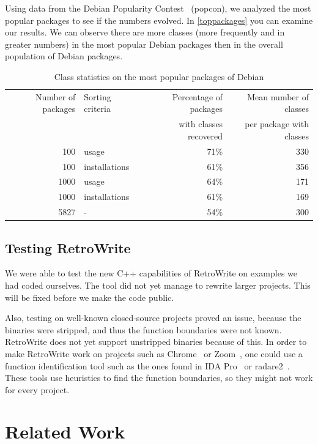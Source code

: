 \documentclass[a4paper,11pt,oneside]{report}
\begin{document}
Using data from the Debian Popularity Contest~\cite{popcon} (popcon), we
analyzed the most popular packages to see if the numbers evolved.
In \autoref{toppackages} you can examine our results.
We can observe there are more classes (more frequently and in greater numbers)
in the most popular Debian packages then in the overall population of Debian
packages.

\begin{table}[h]
  \centering
  {\small
  \begin{tabular}{r | l | r | r}
    Number of packages & Sorting criteria & Percentage of packages & Mean 
    number of classes \\
    & & with classes recovered & per package with classes \\
    \hline
    100 & usage & 71\% & 330 \\
    100 & installations & 61\% & 356 \\
    1000 & usage & 64\% & 171 \\
    1000 & installations & 61\% & 169 \\
    5827 & - & 54\% & 300
  \end{tabular}
  }

\caption{Class statistics on the most popular packages of Debian}
\label{toppackages}

\end{table}


\section{Testing RetroWrite}

We were able to test the new C++ capabilities of RetroWrite on examples we had
coded ourselves.
The tool did not yet manage to rewrite larger projects.
This will be fixed before we make the code public.

Also, testing on well-known closed-source projects proved an issue, because
the binaries were stripped, and thus the function boundaries were not known.
RetroWrite does not yet support unstripped binaries because of this.
In order to make RetroWrite work on projects such as Chrome~\cite{chrome} or
Zoom~\cite{zoom}, one could use a function identification tool such as the
ones found in IDA Pro~\cite{ida} or radare2~\cite{radare}.
These tools use heuristics to find the function boundaries, so they might not
work for every project.


\chapter{Related Work}
\end{document}
